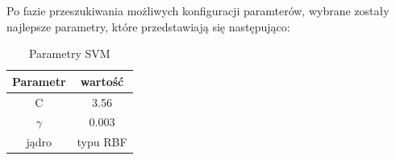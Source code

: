         Po fazie przeszukiwania możliwych konfiguracji paramterów, wybrane zostały najlepsze parametry, które przedstawiają się następująco:
        \begin{table}[H]
            \centering
             \caption{Parametry SVM}
            \label{tab:my_label}
            \begin{tabular}{| c c |}
            \hline
                 Parametr & wartość \\ \hline \hline
                 C & 3.56 \\ \hline
                 $\gamma$ & 0.003 \\ \hline
                 jądro & typu RBF \\ \hline
            \end{tabular}
        \end{table}

